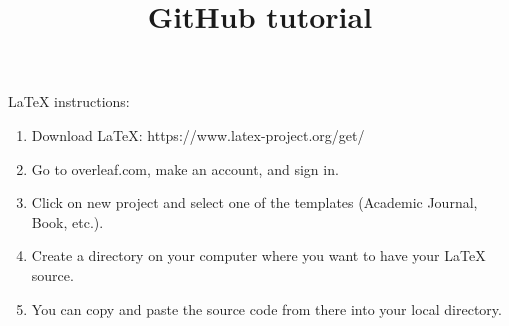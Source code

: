 \documentclass{article}
\begin{document}
\title{GitHub tutorial}

\maketitle

LaTeX instructions:

\begin{enumerate}
    \item Download LaTeX: https://www.latex-project.org/get/
    \item Go to overleaf.com, make an account, and sign in.
    \item Click on new project and select one of the templates (Academic Journal, Book, etc.).
    \item Create a directory on your computer where you want to have your LaTeX source.
    \item You can copy and paste the source code from there into your local directory.
\end{enumerate}
\end{document}
